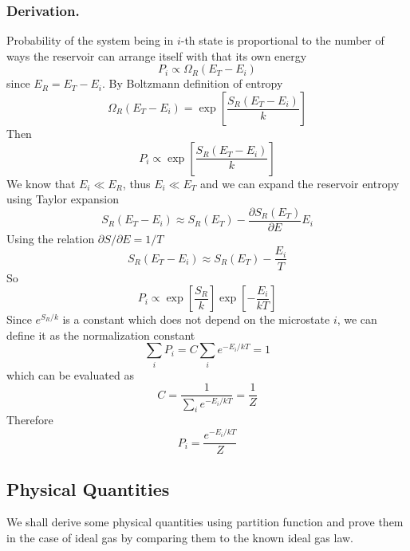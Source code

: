 \documentclass[../../../Main.tex]{subfiles}
\begin{document}
\subsubsection{Derivation.} Probability of the system being in $i$-th state is proportional to the number of ways the reservoir can arrange itself with that its own energy
\begin{equation*}
	P_i\propto \Omega_R(E_T-E_i)
\end{equation*}
since $E_R=E_T-E_i$. By Boltzmann definition of entropy
\begin{equation*}
	\Omega_R(E_T-E_i)=\exp\left[\frac{S_R(E_T-E_i)}{k }\right]
\end{equation*}
Then
\begin{equation*}
	P_i\propto \exp\left[\frac{S_R(E_T-E_i)}{k }\right]
\end{equation*}
We know that $E_i\ll E_R$, thus $E_i\ll E_T$ and we can expand the reservoir entropy using Taylor expansion
\begin{equation*}
	S_R(E_T-E_i)\approx S_R(E_T)-\frac{\partial S_R(E_T)}{\partial E}E_i
\end{equation*}
Using the relation $\partial S/\partial E=1/T$
\begin{equation*}
	S_R(E_T-E_i)\approx S_R(E_T)-\frac{E_i}{T}
\end{equation*}
So
\begin{equation*}
	P_i\propto\exp\left[\frac{S_R}{k }\right]\exp\left[-\frac{E_i}{kT}\right]
\end{equation*}
Since $e^{S_R/k}$ is a constant which does not depend on the microstate $i$, we can define it as the normalization constant
\begin{equation*}
	\sum_i P_i=C\sum_i e^{-E_i/kT}=1
\end{equation*}
which can be evaluated as
\begin{equation*}
	C=\frac{1}{\sum_i e^{-E_i/kT}}=\frac{1}{Z}
\end{equation*}
Therefore
\begin{equation*}
	P_i=\frac{ e^{-E_i/kT}}{Z}
\end{equation*}

\subsection{Physical Quantities}
We shall derive some physical quantities using partition function and prove them in the case of ideal gas by comparing them to the known ideal gas law.
\end{document}
